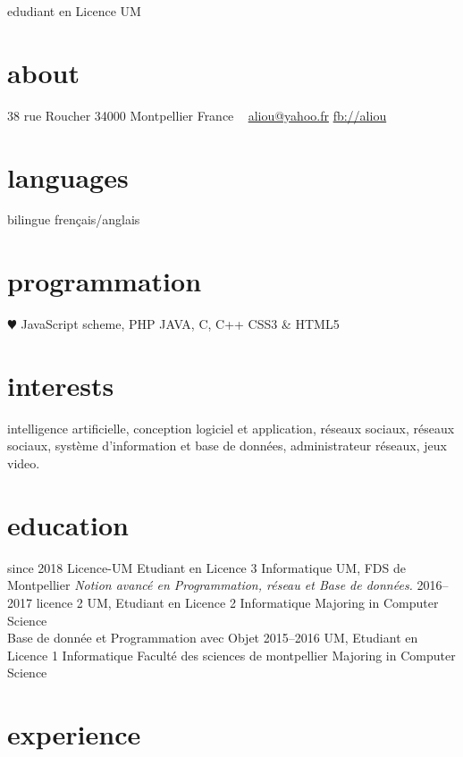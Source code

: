 \documentclass[]{friggeri-cv}
\begin{document}
       {edudiant en Licence UM}


\begin{aside}
  \section{about}
    38 rue Roucher
    34000 Montpellier
    France
    ~
    \href{mailto:aliou@yahoo.fr.net}{aliou@yahoo.fr}
    \href{http://facebook.com/aliou}{fb://aliou}
  \section{languages}
    bilingue frençais/anglais
  \section{programmation}
    {\color{red} $\varheartsuit$} JavaScript
    scheme, PHP
    JAVA, C, C++
    CSS3 \& HTML5
\end{aside}

\section{interests}
intelligence artificielle, conception logiciel et application, réseaux sociaux, 
réseaux sociaux, système d'information et base de données, administrateur réseaux, jeux video.

\section{education}

\begin{entrylist}
  \entry
    {since 2018}
    {Licence-UM {\normalfont Etudiant en Licence 3 Informatique}}
    {UM, FDS de Montpellier}
    {\emph{Notion avancé en Programmation, réseau et Base de données.}}
  \entry
    {2016–2017}
    {licence 2}
    {UM, Etudiant en Licence 2 Informatique}
    {Majoring in Computer Science\\
    Base de donnée et Programmation avec Objet}
  \entry
    {2015–2016}
    {UM, Etudiant en Licence 1 Informatique}
    {Faculté des sciences de montpellier}
    {Majoring in Computer Science}
\end{entrylist}

\section{experience}
\end{document}
